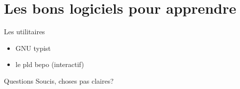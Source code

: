 \section{Les bons logiciels pour apprendre}
\begin{frame}{Les utilitaires}
    \begin{itemize}
	\item GNU typist
	\item le pld bepo (interactif)
    \end{itemize}
\end{frame}

\begin{frame}{Questions}
Soucis, choses pas claires?
\end{frame}
